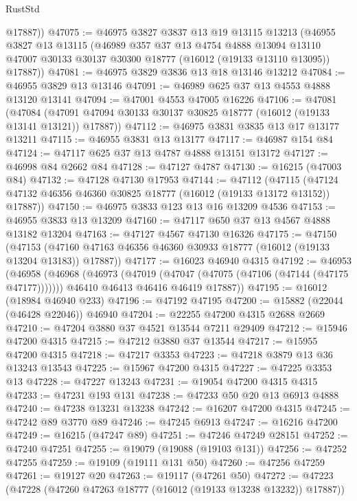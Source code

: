 \begin{lexlean}{RustStd}
\begin{coremodule}
        @17887))
@47075 := @46975
    @3827
    @3837
    @13
    @19
    @13115
    @13213
    (@46955
      @3827
      @13
      @13115
      (@46989
        @357
        @37
        @13
        @4754
        @4888
        @13094
        @13110
        @47007
        @30133
        @30137
        @30300
        @18777
        (@16012 (@19133 @13110 @13095))
        @17887))
@47081 := @46975 @3829 @3836 @13 @18 @13146 @13212
@47084 := @46955 @3829 @13 @13146
@47091 := @46989 @625 @37 @13 @4553 @4888 @13120 @13141
@47094 := @47001 @4553 @47005 @16226
@47106 := @47081
    (@47084 (@47091 @47094 @30133 @30137 @30825 @18777 (@16012 (@19133 @13141 @13121)) @17887))
@47112 := @46975 @3831 @3835 @13 @17 @13177 @13211
@47115 := @46955 @3831 @13 @13177
@47117 := @46987 @154 @84
@47124 := @47117 @625 @37 @13 @4787 @4888 @13151 @13172
@47127 := @46998 @84 @2662 @84
@47128 := @47127 @4787
@47130 := @16215 (@47003 @84)
@47132 := @47128 @47130 @17953
@47144 := @47112
    (@47115 (@47124 @47132 @46356 @46360 @30825 @18777 (@16012 (@19133 @13172 @13152)) @17887))
@47150 := @46975 @3833 @123 @13 @16 @13209 @4536
@47153 := @46955 @3833 @13 @13209
@47160 := @47117 @650 @37 @13 @4567 @4888 @13182 @13204
@47163 := @47127 @4567 @47130 @16326
@47175 := @47150
    (@47153 (@47160 @47163 @46356 @46360 @30933 @18777 (@16012 (@19133 @13204 @13183)) @17887))
@47177 := @16023 @46940 @4315
@47192 := @46953
    (@46958
      (@46968
        (@46973 (@47019 (@47047 (@47075 (@47106 (@47144 (@47175 @47177)))))))
        @46410
        @46413
        @46416
        @46419
        @17887))
@47195 := @16012 (@18984 @46940 @233)
@47196 := @47192 @47195
@47200 := @15882 (@22044 (@46428 @22046)) @46940
@47204 := @22255 @47200 @4315 @2688 @2669
@47210 := @47204 @3880 @37 @4521 @13544 @7211 @29409
@47212 := @15946 @47200 @4315
@47215 := @47212 @3880 @37 @13544
@47217 := @15955 @47200 @4315
@47218 := @47217 @3353
@47223 := @47218 @3879 @13 @36 @13243 @13543
@47225 := @15967 @47200 @4315
@47227 := @47225 @3353 @13
@47228 := @47227 @13243
@47231 := @19054 @47200 @4315 @4315
@47233 := @47231 @193 @131
@47238 := @47233 @50 @20 @13 @6913 @4888
@47240 := @47238 @13231 @13238
@47242 := @16207 @47200 @4315
@47245 := @47242 @89 @3770 @89
@47246 := @47245 @6913
@47247 := @16216 @47200
@47249 := @16215 (@47247 @89)
@47251 := @47246 @47249 @28151
@47252 := @47240 @47251
@47255 := @19079 (@19088 (@19103 @131))
@47256 := @47252 @47255
@47259 := @19109 (@19111 @131 @50)
@47260 := @47256 @47259
@47261 := @19127 @20
@47263 := @19117 (@47261 @50)
@47272 := @47223 (@47228 (@47260 @47263 @18777 (@16012 (@19133 @13238 @13232)) @17887))

\end{coremodule}
\end{lexlean}
